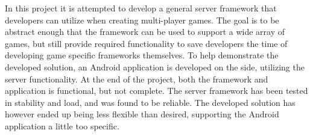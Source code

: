 
In this project it is attempted to develop a general server framework that developers can utilize when creating multi-player games. The goal is to be abstract enough that the framework can be used to support a wide array of games, but still provide required functionality to save developers the time of developing game specific frameworks themselves. To help demonstrate the developed solution, an Android application is developed on the side, utilizing the server functionality. At the end of the project, both the framework and application is functional, but not complete. The server framework has been tested in stability and load, and was found to be reliable. The developed solution has however ended up being less flexible than desired, supporting the Android application a little too specific.
